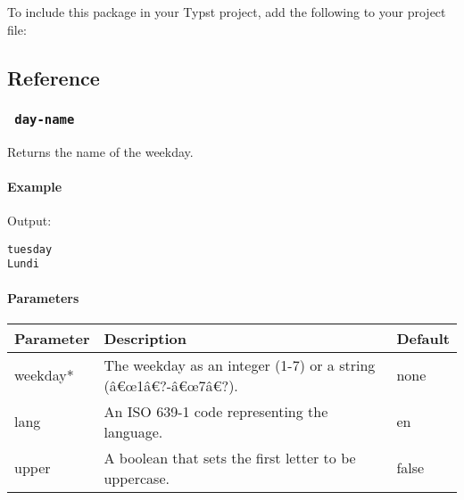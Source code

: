 To include this package in your Typst project, add the following to your
project file:

\begin{Shaded}
\begin{Highlighting}[]
\end{Highlighting}
\end{Shaded}

\subsection{Reference}\label{reference}

\subsubsection{\texorpdfstring{\texttt{\ day-name\ }}{ day-name }}\label{day-name}

Returns the name of the weekday.

\paragraph{Example}\label{example}

\begin{Shaded}
\begin{Highlighting}[]

\end{Highlighting}
\end{Shaded}

Output:

\begin{verbatim}
tuesday
Lundi
\end{verbatim}

\paragraph{Parameters}\label{parameters}

\begin{Shaded}
\begin{Highlighting}[]
\end{Highlighting}
\end{Shaded}

\begin{longtable}[]{@{}lll@{}}
\toprule\noalign{}
Parameter & Description & Default \\
\midrule\noalign{}
\endhead
\bottomrule\noalign{}
\endlastfoot
weekday* & The weekday as an integer (1-7) or a string
(â€œ1â€?-â€œ7â€?). & none \\
lang & An ISO 639-1 code representing the language. & en \\
upper & A boolean that sets the first letter to be uppercase. & false \\
\end{longtable}

